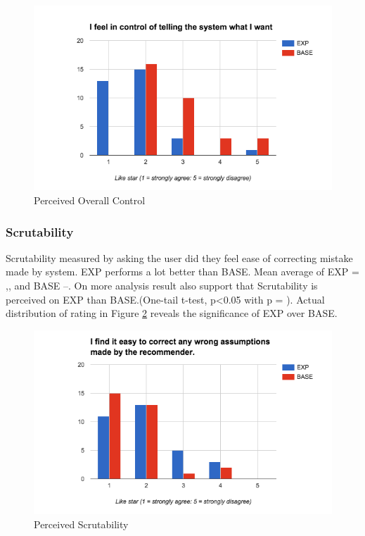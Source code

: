 \begin{figure}[h]
	\centering
	\includegraphics[width= 1\linewidth]{figures/ch5_stat_overall_control}
	\caption{Perceived Overall Control}
	\label{fig:ch5_stat_overall_control}
\end{figure}

\subsubsection{Scrutability}

Scrutability measured by asking the user did they feel ease of correcting mistake made by system. EXP performs a lot better than BASE. Mean average of EXP = ,, and BASE --. On more analysis result also support that Scrutability is perceived on EXP than BASE.(One-tail t-test, p<0.05 with p = ). 
Actual distribution of rating in Figure \ref{fig:ch5_stat_scrutability} reveals the significance of EXP over BASE. 

\begin{figure}[h]
	\centering
	\includegraphics[width= 1\linewidth]{figures/ch5_stat_scrutability}
	\caption{Perceived Scrutability}
	\label{fig:ch5_stat_scrutability}
\end{figure}


